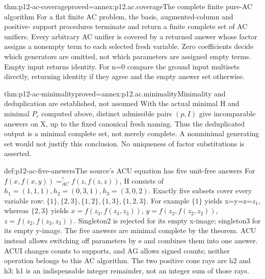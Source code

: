 \begin{hbtheorem}{thm:p12-ac-coverage}{proved=annex:p12.ac.coverage}{The complete finite pure-AC algorithm}
For a flat finite AC problem, the basis, augmented-column and positive-
support procedures terminate and return a finite complete set of AC
unifiers. Every arbitrary AC unifier is covered by a returned answer
whose factor assigns a nonempty term to each selected fresh variable.
Zero coefficients decide which generators are omitted, not which
parameters are assigned empty terms. Empty input returns identity.
For n=0 compare the ground input multisets directly, returning identity
if they agree and the empty answer set otherwise.
\end{hbtheorem}

\begin{hbtheorem}{thm:p12-ac-minimality}{proved=annex:p12.ac.minimality}{Minimality and deduplication are established, not assumed}
With the actual minimal H and minimal \(P_c\) computed above,
distinct admissible pairs \((p,I)\) give incomparable answers
on X, up to the fixed canonical fresh naming. Thus the deduplicated
output is a minimal complete set, not merely complete. A nonminimal
generating set would not justify this conclusion. No uniqueness of
factor substitutions is asserted.
\end{hbtheorem}

\begin{hbexample}{def:p12-ac-five-answers}{The source's ACU equation has five unit-free answers}
For \(f(x,f(x,y))=^{?}_{AC}f(z,f(z,z))\), H consists of
\(h_1=(1,1,1),h_2=(0,3,1),h_3=(3,0,2)\).
Exactly five subsets cover every variable row:
\(\{1\},\{2,3\},\{1,2\},\{1,3\},\{1,2,3\}\).
For example \(\{1\}\) yields x=y=z=\(z_1\), whereas
\(\{2,3\}\) yields \(x=f(z_3,f(z_3,z_3))\),
\(y=f(z_2,f(z_2,z_2))\), \(z=f(z_2,f(z_3,z_3))\).
Singleton2 is rejected for its empty x-image; singleton3 for its
empty y-image. The five answers are minimal complete by the theorem.
ACU instead allows switching off parameters by e and combines them
into one answer. ACUI changes counts to supports, and AG allows signed
counts; neither operation belongs to this AC algorithm.
The two positive cone rays are h2 and h3; h1 is an indispensable
integer remainder, not an integer sum of those rays.
\cite[pp.~505--506]{BaaderSnyder2001}
\end{hbexample}

